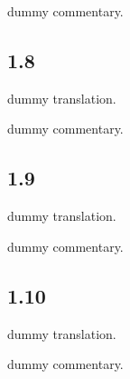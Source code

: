 \begin{ekdosis}
  \begin{philcomm}[hp01_007]          
    dummy commentary.
  \end{philcomm}


  \subsection*{1.8}
  \begin{translation}[hp01_008]
    dummy translation.
  \end{translation}
  
  \begin{philcomm}[hp01_008]          
    dummy commentary.
  \end{philcomm}

  \subsection*{1.9}
  \begin{translation}[hp01_009]
    dummy translation.
  \end{translation}
  
  \begin{philcomm}[hp01_009]          
    dummy commentary.
  \end{philcomm}

  \subsection*{1.10}
  \begin{translation}[hp01_010]
    dummy translation.
  \end{translation}
  
  \begin{philcomm}[hp01_010]          
    dummy commentary.
  \end{philcomm}

\end{ekdosis}

